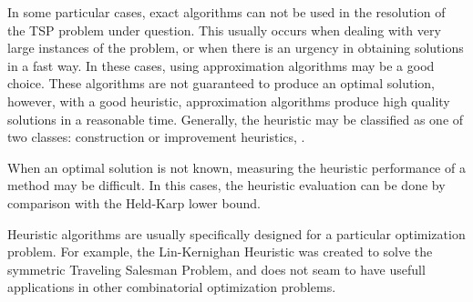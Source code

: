 
In some particular cases, exact algorithms can not be used in the resolution
of the TSP problem under question. This usually occurs when dealing with very
large instances of the problem, or when there is an urgency in obtaining solutions
in a fast way. In these cases, using approximation algorithms may be a good choice.
These algorithms are not guaranteed to produce an optimal solution,
however, with a good heuristic, approximation algorithms produce high quality solutions 
in a reasonable time.
Generally, the heuristic may be classified as one of two classes: 
construction or improvement heuristics, \cite{heuristics_tsp}.

When an optimal solution is not known, measuring the heuristic performance
of a method may be difficult. In this cases, the heuristic evaluation can be
done by comparison with the Held-Karp lower bound.

Heuristic algorithms are usually specifically designed for a particular optimization problem.
For example, the Lin-Kernighan Heuristic was created to solve the symmetric Traveling Salesman Problem,
and does not seam to have usefull applications in other combinatorial optimization problems.